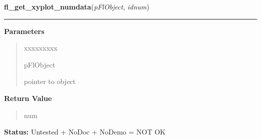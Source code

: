\hspace{.8\funcindent}\begin{boxedminipage}{\funcwidth}

    \raggedright \textbf{fl\_get\_xyplot\_numdata}(\textit{pFlObject}, \textit{idnum})

    \vspace{-1.5ex}

    \rule{\textwidth}{0.5\fboxrule}
\setlength{\parskip}{2ex}
\setlength{\parskip}{1ex}
      \textbf{Parameters}
      \vspace{-1ex}

      \begin{quote}
        \begin{Ventry}{xxxxxxxxx}

          \item[pFlObject]

          pointer to object

        \end{Ventry}

      \end{quote}

      \textbf{Return Value}
    \vspace{-1ex}

      \begin{quote}
      num

      \end{quote}

\textbf{Status:} Untested + NoDoc + NoDemo = NOT OK



    \end{boxedminipage}

    \label{xformslib:flxyplot:fl_xyplot_s2w}

    \vspace{0.5ex}

